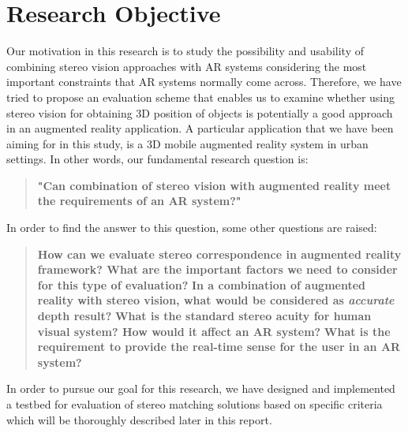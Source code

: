 \documentclass[dvips,letterpaper,12pt]{report}
\begin{document}
\section {Research Objective}

Our motivation in this research is to study the possibility and usability of combining stereo vision approaches with AR systems considering the most important constraints that AR systems
normally come across. Therefore, we have tried to propose an evaluation scheme that enables us to examine whether using stereo vision
for obtaining 3D position of objects is potentially a good approach in an augmented reality application. A particular application that we have been aiming for in
this study, is a 3D mobile augmented reality system in urban settings. 
In other words, our fundamental research question is: \newline

\begin{quote}
\textbf{"Can combination of stereo vision with augmented reality meet the requirements of an AR system?"} \newline
\end{quote}
In order to find the answer to this question, some other questions are raised:
\begin{quote}
\textbf {How can we evaluate stereo correspondence in augmented reality framework? What are the important factors we need to consider for this type of evaluation?}
\textbf {In a combination of augmented reality with stereo vision, what would be considered as {\it accurate} depth result?}
\textbf {What is the standard stereo acuity for human visual system? How would it affect an AR system?}
\textbf {What is the requirement to provide the real-time sense for the user in an AR system?}
\end{quote}

In order to pursue our goal for this research, we have designed and implemented a testbed for evaluation of
stereo matching solutions based on specific criteria which will be thoroughly described later in this report.
\end{document}
